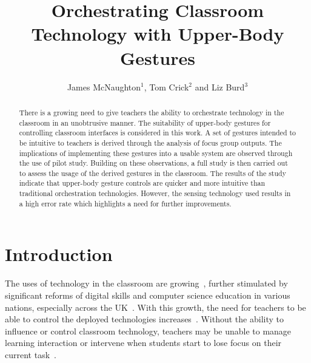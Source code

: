 \documentclass[link]{IWCOMP}
\begin{document}
\title{Orchestrating Classroom Technology with Upper-Body Gestures}

\author{James McNaughton$^{1}$, Tom Crick$^{2}$ and Liz Burd$^{3}$}



\begin{abstract}
   There is a growing need to give teachers the ability to orchestrate technology in the classroom in an unobtrusive manner.
   The suitability of upper-body gestures for controlling classroom interfaces is considered in this work.
   A set of gestures intended to be intuitive to teachers is derived through the analysis of focus group outputs.
   The implications of implementing these gestures into a usable system are observed through the use of pilot study.
   Building on these observations, a full study is then carried out to assess the usage of the derived gestures in the classroom.
   The results of the study indicate that upper-body gesture controls are quicker and more intuitive than traditional orchestration technologies.
   However, the sensing technology used results in a high error rate which highlights a need for further improvements.
\end{abstract}




\maketitle

\section{Introduction}
\label{sec:intro}

The uses of technology in the classroom are
growing~\citep{Schrum2008,Lloyd2011,Robertson2012},
further stimulated by significant reforms of digital skills and computer science education in various nations, especially across the UK~\citep{brown-et-al:toce2014}.
With this growth, the need for teachers to be able to control the deployed technologies increases~\citep{Apple1990,Selwyn2010,Selwyn2011}.
Without the ability to influence or control classroom technology, teachers may be unable to manage learning interaction or intervene when students start to lose focus on their current task~\citep{Chen2005,Karabenick2011}.
\end{document}
